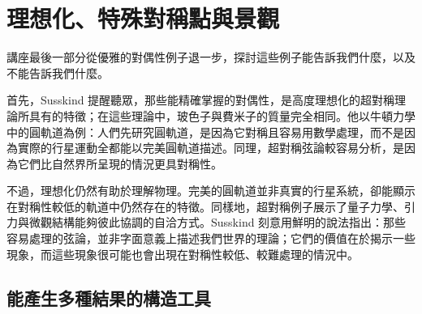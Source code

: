 \begin{classroomqa}
\end{classroomqa}

\begin{classroomqa}
\end{classroomqa}

\begin{classroomqa}
\end{classroomqa}

\section{理想化、特殊對稱點與景觀}

講座最後一部分從優雅的對偶性例子退一步，探討這些例子能告訴我們什麼，以及不能告訴我們什麼。

首先，Susskind 提醒聽眾，那些能精確掌握的對偶性，是高度理想化的超對稱理論所具有的特徵；在這些理論中，玻色子與費米子的質量完全相同。他以牛頓力學中的圓軌道為例：人們先研究圓軌道，是因為它對稱且容易用數學處理，而不是因為實際的行星運動全都能以完美圓軌道描述。同理，超對稱弦論較容易分析，是因為它們比自然界所呈現的情況更具對稱性。

不過，理想化仍然有助於理解物理。完美的圓軌道並非真實的行星系統，卻能顯示在對稱性較低的軌道中仍然存在的特徵。同樣地，超對稱例子展示了量子力學、引力與微觀結構能夠彼此協調的自洽方式。Susskind 刻意用鮮明的說法指出：那些容易處理的弦論，並非字面意義上描述我們世界的理論；它們的價值在於揭示一些現象，而這些現象很可能也會出現在對稱性較低、較難處理的情況中。

\subsection{能產生多種結果的構造工具}

